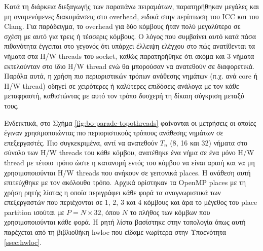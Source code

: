 Κατά τη διάρκεια διεξαγωγής των παραπάνω πειραμάτων, παρατηρήθηκαν μεγάλες και μη αναμενόμενες διακυμάνσεις στο overhead, ειδικά στην περίπτωση του ICC και του Clang. Για παράδειγμα, το overhead για δύο κόμβους ήταν πολύ μεγαλύτερο σε σχέση με αυτό για τρεις ή τέσσερις κόμβους. Ο λόγος που συμβαίνει αυτό κατά πάσα πιθανότητα έγγειται στο γεγονός ότι υπάρχει έλλειψη ελέγχου στο πώς ανατίθενται τα νήματα στα H/W threads του socket, καθώς παρατηρήθηκε ότι ακόμα και 3 νήματα εκτελούνταν στο ίδιο H/W thread ενώ θα μπορούσαν να ανατεθούν σε διαφορετικά. Παρόλα αυτά, η χρήση πιο περιοριστικών τρόπων ανάθεσης νημάτων (π.χ. ανά core ή H/W thread) οδηγεί σε χειρότερες ή καλύτερες επιδόσεις ανάλογα με τον κάθε μεταφραστή, καθιστώντας με αυτό τον τρόπο δυσχερή τη δίκαιη σύγκριση μεταξύ τους.

Ενδεικτικά, στο Σχήμα \ref{fig:bo-parade-topothreads} φαίνονται οι μετρήσεις οι οποίες έγιναν χρησιμοποιώντας πιο περιοριστικούς τρόπους ανάθεσης νημάτων σε επεξεργαστές. Πιο συγκεκριμένα, αντί να ανατεθούν $T_n$ (8, 16 και 32) νήματα στο σύνολο των H/W threads του κάθε κόμβου, ανατέθηκε ένα νήμα σε ένα μόνο H/W thread με τέτοιο τρόπο ώστε η κατανομή εντός του κόμβου να είναι αραιή και να μη χρησιμοποιούνται H/W threads που ανήκουν σε γειτονικά places. Η ανάθεση αυτή επιτεύχθηκε με τον ακόλουθο τρόπο. Αρχικά ορίστηκαν τα OpenMP places με τη χρήση ρητής λίστας η οποία περιγράφει κάθε φορά τα αναγνωριστικά των επεξεργαστών που περιέχονται σε 1, 2, 3 και 4 κόμβους και άρα το μέγεθος του place partition ισούται με $P = N \times 32$, όπου $N$ το πλήθος των κόμβων που χρησιμοποιούνται κάθε φορά. Η ρητή λίστα βασίστηκε στην τοπολογία όπως αυτή παρέχεται από τη βιβλιοθήκη hwloc που είδαμε νωρίτερα στην Υποενότητα \ref{ssec:hwloc}.

